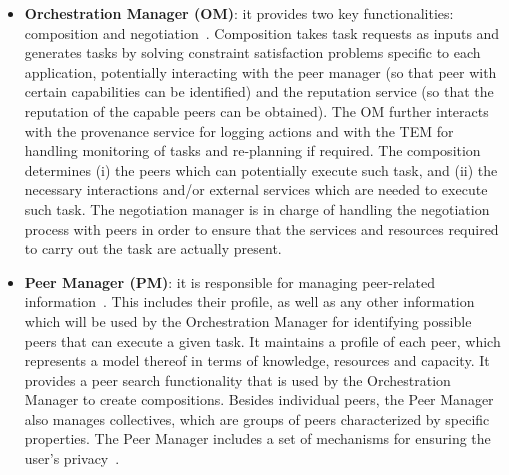 \begin{itemize}

\item \textbf{Orchestration Manager (OM)}: it provides two key functionalities: composition and negotiation~\cite{D6.2}. Composition takes task requests as inputs and generates tasks by solving constraint satisfaction problems specific to each application, potentially interacting with the peer manager (so that peer with certain capabilities can be identified) and the reputation service (so that the reputation of the capable peers can be obtained). The OM further interacts with the provenance service for logging actions and with the TEM for handling monitoring of tasks and re-planning if required. The composition determines (i) the peers which can potentially execute such task, and (ii) the necessary interactions and/or external services which are needed to execute such task. The negotiation manager is in charge of handling the negotiation process with peers in order to ensure that the services and resources required to carry out the task are actually present. %

\item \textbf{Peer Manager (PM)}: it is responsible for managing peer-related information~\cite{D4.3}. This includes their profile, as well as any other information which will be used by the Orchestration Manager for identifying possible peers that can execute a given task.  It maintains a profile of each peer, which
represents a model thereof in terms of knowledge, resources and
capacity. It provides a peer search functionality that is used by the Orchestration Manager to create compositions. Besides individual peers, the Peer Manager also manages collectives, which are groups of peers characterized by specific properties. %
The Peer Manager includes a set of mechanisms for ensuring the user's privacy~\cite{D4.3}.


\end{itemize}
